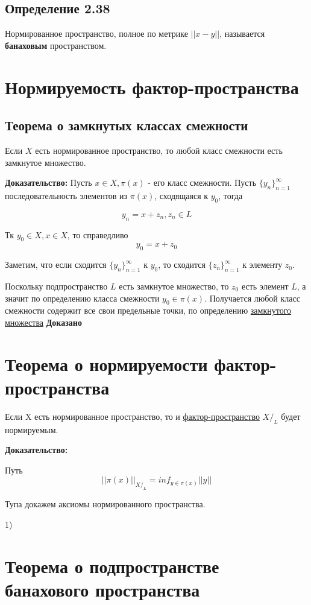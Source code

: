 \documentclass[12pt, english]{article}
\begin{document}
\subsection{Определение 2.38}
	Нормированное пространство, полное по метрике $||x - y||$, называется \textbf{банаховым} пространством.	

\section{Нормируемость фактор-пространства}	
	
\subsection{Теорема о замкнутых классах смежности}

	Если $X$ есть нормированное пространство, то любой класс смежности есть замкнутое множество.
	
	\textbf{Доказательство:}
	Пусть $x \in X , \pi(x)$ - его класс смежности. 
	Пусть $\{ y_n \}_{n = 1}^{\infty}$ последовательность элементов из $\pi(x)$, сходящаяся к $y_0$, тогда
	
	$$y_n = x + z_n , z_n \in L $$
	
	Тк $y_0 \in X, x \in X$, то справедливо 
	$$y_0 = x + z_0$$
	
	Заметим, что если сходится  $\{ y_n \}_{n = 1}^{\infty}$ к $y_0$, то сходится $\{ z_n \}_{n = 1}^{\infty}$ к элементу $z_0$. 

 Поскольку подпространство $L$ есть замкнутое множество,
то $z_0$ есть элемент $L$, а значит по определению класса смежности $y_0 \in \pi(x)$. Получается любой класс смежности содержит все свои предельные точки, по определению \hyperref[eq101]{замкнутого множества} \textbf{Доказано}
	
\section{Теорема о нормируемости фактор-пространства}
	Если X есть нормированное пространство,
то и \hyperref[eq102]{фактор-пространство} $X\text{/}_L$ будет нормируемым.
		
\textbf{Доказательство:} 

	Путь $$||\pi(x)||_{X\text{/}_L} = inf_{y \in \pi(x)} ||y|| $$
	
Тупа докажем аксиомы нормированного пространства.

1) 	
	
	
	
	
\section{Теорема о подпространстве банахового пространства}
\end{document}
